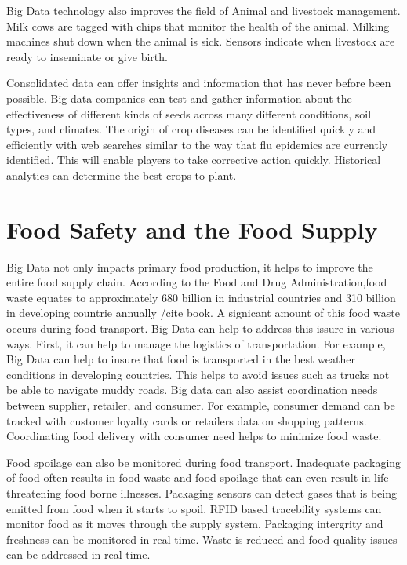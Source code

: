 \documentclass[sigconf]{acmart}
\begin{document}
Big Data technology also improves the field of Animal and livestock management. Milk cows are tagged with chips that monitor the health of the animal. Milking machines shut down when the animal is sick. Sensors indicate when livestock are ready to inseminate or give birth. 

Consolidated data can offer insights and information that has never before been possible. Big data companies can test and gather information about the effectiveness of different kinds of seeds across many different conditions, soil types, and climates. The origin of crop diseases can be identified quickly and efficiently with web searches similar to the way that flu epidemics are currently identified. This will enable players to take corrective action quickly. Historical analytics can determine the best crops to plant. 


\section{Food Safety and the Food Supply}

Big Data not only impacts primary food production, it helps to improve the entire food supply chain. According to the Food and Drug Administration,food waste equates to approximately 680 billion in industrial countries and 310 billion in developing countrie annually /cite {book}. A signicant amount of this food waste occurs during food transport. Big Data can help to address this issure in various ways. First, it can help to manage the logistics of transportation. For example, Big Data can help to insure that food is transported in the best weather conditions in developing countries. This helps to avoid issues such as trucks not be able to navigate muddy roads. Big data can also assist coordination needs between supplier, retailer, and consumer. For example, consumer demand can be tracked with customer loyalty cards or retailers data on shopping patterns. Coordinating food delivery with consumer need helps to minimize food waste.

Food spoilage can also be monitored during food transport. Inadequate packaging of food often results in food waste and food spoilage that can even result in life threatening food borne illnesses. Packaging sensors can detect gases that is being emitted from food when it starts to spoil. RFID based tracebility systems can monitor food as it moves through the supply system. Packaging intergrity and freshness can be monitored in real time. Waste is reduced and food quality issues can be addressed in real time. \cite{www-google1} 
\end{document}
